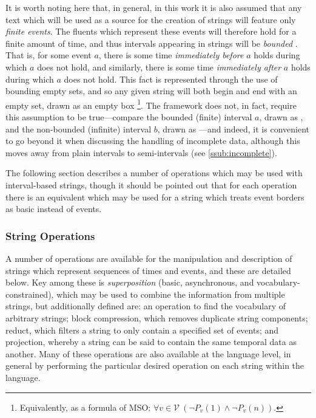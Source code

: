 \documentclass[a4paper,12pt,leqno]{article}
\newcommand{\vph}[1]{\vphantom{#1}}
\newcommand{\ebox}[1]{\fbox{$\vph{'(),}#1$}}
\newcommand{\V}{\mathcal{V}}
\newcommand{\EventString}[1]{%
	\renewcommand*{\do}[1]{\ebox{##1}}%
	\PipeParser{#1}%
}
\begin{document}
It is worth noting here that, in general, in this work it is also assumed that any text which will be used as a source for the creation of strings will feature only \textit{finite events}. The fluents which represent these events will therefore hold for a finite amount of time, and thus intervals appearing in strings will be \textit{bounded} \citep{allen1994actions}. That is, for some event $a$, there is some time \textit{immediately before} $a$ holds during which $a$ does not hold, and similarly, there is some time \textit{immediately after} $a$ holds during which $a$ does not hold. This fact is represented through the use of bounding empty sets, and so any given string will both begin and end with an empty set, drawn as an empty box \ebox{}\footnote{Equivalently, as a formula of MSO: $\forall v \in \V~ (\lnot P_v(1) \land \lnot P_v(n))$.}. The framework does not, in fact, require this assumption to be true---compare the bounded (finite) interval $a$, drawn as \EventString{{}|a|{}}, and the non-bounded (infinite) interval $b$, drawn as \EventString{b}---and indeed, it is convenient to go beyond it when discussing the handling of incomplete data, although this moves away from plain intervals to semi-intervals (see \cref{ssub:incomplete}).

The following section describes a number of operations which may be used with interval-based strings, though it should be pointed out that for each operation there is an equivalent which may be used for a string which treats event borders as basic instead of events.

\subsubsection{String Operations}\label{ssub:operations}
A number of operations are available for the manipulation and description of strings which represent sequences of times and events, and these are detailed below. Key among these is \textit{superposition} (basic, asynchronous, and vocabulary-constrained), which may be used to combine the information from multiple strings, but additionally defined are: an operation to find the vocabulary of arbitrary strings; block compression, which removes duplicate string components; reduct, which filters a string to only contain a specified set of events; and projection, whereby a string can be said to contain the same temporal data as another. Many of these operations are also available at the language level, in general by performing the particular desired operation on each string within the language.
\end{document}
